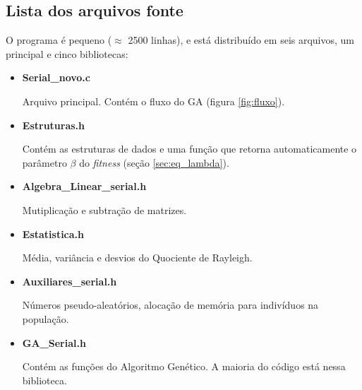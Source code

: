 \subsection{Lista dos arquivos fonte}
	
	O programa é pequeno ($\approx$ 2500 linhas), e está distribuído em seis arquivos, um principal e cinco bibliotecas:
	
	\begin{itemize}
		\item \textbf{Serial\_novo.c}
		
		Arquivo principal. Contém o fluxo do GA (figura \ref{fig:fluxo}).
		
		\item \textbf{Estruturas.h}
		
		Contém as estruturas de dados e uma função que retorna automaticamente o parâmetro $\beta$ do \emph{fitness} (seção \ref{sec:eq_lambda}).
		
		\item \textbf{Algebra\_Linear\_serial.h}
		
		Mutiplicação e subtração de matrizes.
		
		\item \textbf{Estatistica.h}
		
		Média, variância e desvios do Quociente de Rayleigh.
		
		\item \textbf{Auxiliares\_serial.h}
		
		Números pseudo-aleatórios, alocação de memória para indivíduos na população.
		
		\item \textbf{GA\_Serial.h}
		
		Contém as funções do Algoritmo Genético. A maioria do código está nessa biblioteca.	
		
	\end{itemize}
					
